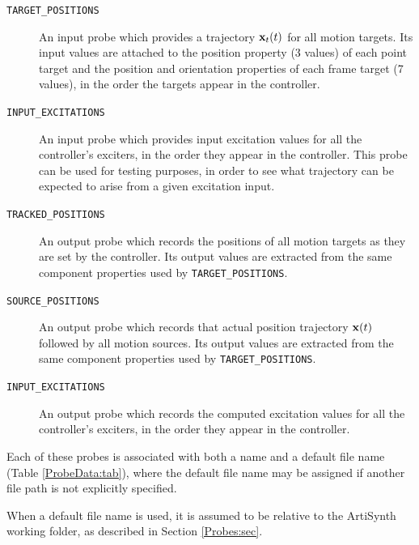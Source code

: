 \begin{description}

\item[{\tt TARGET\_POSITIONS}]\mbox{}

An input probe which provides a trajectory ${\bf x}_t(t)$ for all motion
targets. Its input values are attached to the {\sf position} property (3 values)
of each point target and the {\sf position} and {\sf orientation} properties of
each frame target (7 values), in the order the targets appear in the
controller.

\item[{\tt INPUT\_EXCITATIONS}]\mbox{}

An input probe which provides input excitation values for all the controller's
exciters, in the order they appear in the controller. This probe can be used
for testing purposes, in order to see what trajectory can be expected to arise
from a given excitation input.

\item[{\tt TRACKED\_POSITIONS}]\mbox{}

An output probe which records the positions of all motion targets as they are
set by the controller. Its output values are extracted from the same component
properties used by {\tt TARGET\_POSITIONS}.

\item[{\tt SOURCE\_POSITIONS}]\mbox{}

An output probe which records that actual position trajectory ${\bf x}(t)$ followed
by all motion sources. Its output values are extracted from the same component
properties used by {\tt TARGET\_POSITIONS}.

\item[{\tt INPUT\_EXCITATIONS}]\mbox{}

An output probe which records the computed excitation values for all the
controller's exciters, in the order they appear in the controller.

\end{description}

Each of these probes is associated with both a name and a default file name
(Table \ref{ProbeData:tab}), where the default file name may be assigned if
another file path is not explicitly specified.

\begin{sideblock}
When a default file name is used, it is assumed to be relative to the ArtiSynth
working folder, as described in Section \ref{Probes:sec}.
\end{sideblock}

